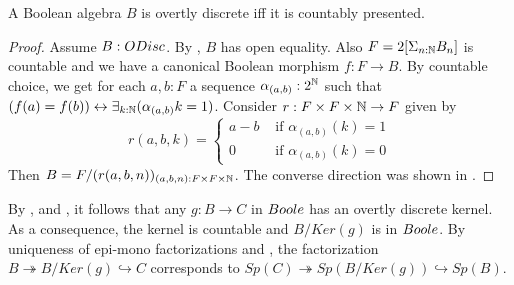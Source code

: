 \begin{corollary}\label{ODiscBAareBoole}
  A Boolean algebra $B$ is overtly discrete iff it is countably presented. 
\end{corollary}
\begin{proof}
  Assume $B:\ODisc$. 
  By , $B$ has open equality. 
  Also $F = 2[\Sigma_{n:\mathbb{N}}B_n]$ is countable and we have a canonical 
  Boolean morphism $f:F \to B$. 
  By countable choice, we get for each $a,b:F$
  a sequence $\alpha_{(a,b)}:2^{\mathbb{N}}$ such that 
  $(f(a) = f(b))\leftrightarrow \exists_{k:\mathbb{N}} (\alpha_{(a,b)}k =1)$. 
  Consider 
  $r:F \times F \times \mathbb{N} \to F$ 
  given by 
  $$r(a,b,k) =\begin{cases}
    a-b &\text{ if } \alpha_{(a,b)}(k) = 1\\
    0   &\text{ if } \alpha_{(a,b)}(k) = 0
  \end{cases}
  $$
  Then $B= F/(r (a,b,n))_{(a,b,n): F \times F \times \mathbb{N}}$. 
  The converse direction was shown in .
\end{proof}
\begin{remark}\label{BooleEpiMono}
  By ,  and , 
  it follows that any 
  $g:B\to C$ in $\Boole$ has an overtly discrete kernel.
  As a consequence, the kernel is countable and $B/Ker(g)$ is in $\Boole$. 
  By uniqueness of epi-mono factorizations and , 
  the factorization 
  $B\twoheadrightarrow B/Ker(g) \hookrightarrow C$ corresponds to 
  $Sp(C) \twoheadrightarrow Sp(B/Ker(g)) \hookrightarrow Sp(B)$. 
\end{remark}
